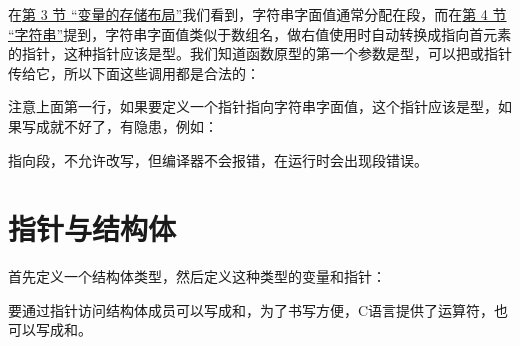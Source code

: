 在\hyperlink{db.ch19s03.id2777491}{第 3 节 “变量的存储布局”}我们看到，字符串字面值通常分配在段，而在\hyperlink{db.ch08s04.id2734544}{第 4 节 “字符串”}提到，字符串字面值类似于数组名，做右值使用时自动转换成指向首元素的指针，这种指针应该是型。我们知道函数原型的第一个参数是型，可以把或指针传给它，所以下面这些调用都是合法的：




注意上面第一行，如果要定义一个指针指向字符串字面值，这个指针应该是型，如果写成就不好了，有隐患，例如：




指向段，不允许改写，但编译器不会报错，在运行时会出现段错误。




\section{指针与结构体}
%
首先定义一个结构体类型，然后定义这种类型的变量和指针：




要通过指针访问结构体成员可以写成和，为了书写方便，C语言提供了\BookCode{-\BookSplit{}\textgreater{}}运算符，也可以写成和。




